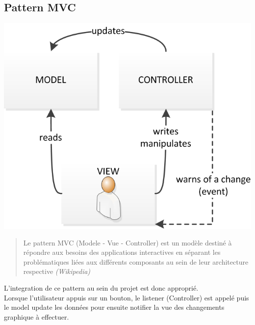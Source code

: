 \documentclass{article}
\begin{document}
	\subsection{Pattern MVC}	
	\begin{center}
	\includegraphics[scale = 0.8, natwidth = 50, natheight = 50]{modele-mvc.png} 
	\end{center}
	\begin{quote}
	Le pattern MVC (Modele - Vue - Controller) est un modèle destiné à répondre aux besoins des applications
	interactives en séparant les problématiques liées aux différents composants au sein de leur architecture respective
	\textit{(Wikipedia)}
	\end{quote}
	
	L'integration de ce pattern au sein du projet est donc approprié.\\
	Lorsque l'utilisateur appuis sur un bouton, le listener (Controller) est appelé puis le model update les données
	pour ensuite notifier la vue des changements graphique à effectuer.
\end{document}
